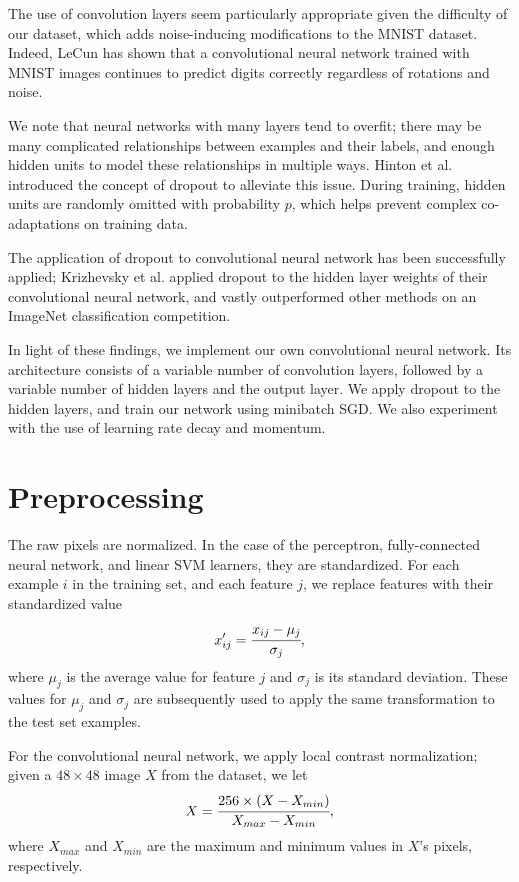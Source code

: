 \documentclass{acm_proc_article-sp}
\begin{document}
The use of convolution layers seem particularly appropriate given the difficulty of our dataset, which adds noise-inducing modifications to the MNIST dataset. Indeed, LeCun has shown that a convolutional neural network trained with MNIST images continues to predict digits correctly regardless of rotations and noise.\cite{LeCun}

We note that neural networks with many layers tend to overfit; there may be many complicated relationships between examples and their labels, and enough hidden units to model these relationships in multiple ways. Hinton et al.\cite{Hinton} introduced the concept of dropout to alleviate this issue. During training, hidden units are randomly omitted with probability $p$, which helps prevent complex co-adaptations on training data. 

The application of dropout to convolutional neural network has been successfully applied; Krizhevsky et al. applied dropout to the hidden layer weights of their convolutional neural network, and vastly outperformed other methods on an ImageNet classification competition.\cite{Krizhevsky} 

In light of these findings, we implement our own convolutional neural network. Its architecture consists of a variable number of convolution layers, followed by a variable number of hidden layers and the output layer. We apply dropout to the hidden layers, and train our network using minibatch SGD. We also experiment with the use of learning rate decay and momentum.

\section{Preprocessing}
The raw pixels are normalized. In the case of the perceptron, fully-connected neural network, and linear SVM learners, they are standardized. For each example $i$ in the training set, and each feature $j$, we replace features with their standardized value $$x'_{ij} = \cfrac{x_{ij} - \mu_{j}}{\sigma_{j}},$$ where $\mu_j$ is the average value for feature $j$ and $\sigma_j$ is its standard deviation. These values for $\mu_j$ and $\sigma_j$ are subsequently used to apply the same transformation to the test set examples.

For the convolutional neural network, we apply local contrast normalization; given a $48\times48$ image $X$ from the dataset, we let $$X = \cfrac{256\times (X - X_{min})}{X_{max} - X_{min}},$$ where $X_{max}$ and $X_{min}$ are the maximum and minimum values in $X$'s pixels, respectively. 
\end{document}
